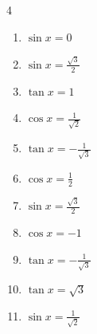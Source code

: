 \begin{multicols}{4}
\begin{enumerate}

  \item $\displaystyle \sin{x}  = 0$


  \item $\displaystyle \sin{x}  = \frac{\sqrt{3}}{2}$


  \item $\displaystyle \tan{x}  = 1$


\columnbreak %

\resetques

  \item $\displaystyle \cos{x}  = \frac{1}{\sqrt{2}}$


  \item $\displaystyle \tan{x}  = -\frac{1}{\sqrt{3}}$


  \item $\displaystyle \cos{x}  = \frac{1}{2}$


  \item $\displaystyle \sin{x}  = \frac{\sqrt{3}}{2}$


  \item $\displaystyle \cos{x}  = -1$


  \item $\displaystyle \tan{x}  = -\frac{1}{\sqrt{3}}$


  \item $\displaystyle \tan{x}  = \sqrt{3}$


  \item $\displaystyle \sin{x}  = \frac{1}{\sqrt{2}}$


\end{enumerate}
\end{multicols}
